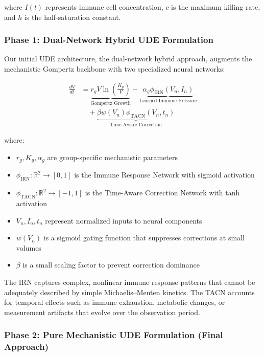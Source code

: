 \documentclass{juliacon}
\begin{document}
where $I(t)$ represents immune cell concentration, $c$ is the maximum killing rate, and $h$ is the half-saturation constant.

\subsubsection{Phase 1: Dual-Network Hybrid UDE Formulation}

Our initial UDE architecture, the dual-network hybrid approach, augments the mechanistic Gompertz backbone with two specialized neural networks:

\begin{align}
\frac{dV}{dt} &= \underbrace{r_g V \ln\left(\frac{K_g}{V}\right)}_{\text{Gompertz Growth}} - \underbrace{\alpha_g \phi_{\text{IRN}}(V_n, I_n)}_{\text{Learned Immune Pressure}} \nonumber \\
&\quad + \underbrace{\beta w(V_n) \phi_{\text{TACN}}(V_n, t_n)}_{\text{Time-Aware Correction}}
\label{eq:dual_network_ude}
\end{align}

where:
\begin{itemize}
    \item $r_g, K_g, \alpha_g$ are group-specific mechanistic parameters
    \item $\phi_{\text{IRN}}: \mathbb{R}^2 \rightarrow [0,1]$ is the Immune Response Network with sigmoid activation
    \item $\phi_{\text{TACN}}: \mathbb{R}^2 \rightarrow [-1,1]$ is the Time-Aware Correction Network with tanh activation
    \item $V_n, I_n, t_n$ represent normalized inputs to neural components
    \item $w(V_n)$ is a sigmoid gating function that suppresses corrections at small volumes
    \item $\beta$ is a small scaling factor to prevent correction dominance
\end{itemize}

The IRN captures complex, nonlinear immune response patterns that cannot be adequately described by simple Michaelis--Menten kinetics. The TACN accounts for temporal effects such as immune exhaustion, metabolic changes, or measurement artifacts that evolve over the observation period.

\subsubsection{Phase 2: Pure Mechanistic UDE Formulation (Final Approach)}
\end{document}
